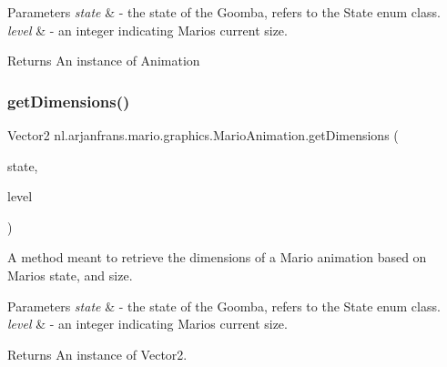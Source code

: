 \begin{DoxyParams}{Parameters}
{\em state} & -\/ the state of the Goomba, refers to the State enum class. \\
\hline
{\em level} & -\/ an integer indicating Mario\textquotesingle{}s current size. \\
\hline
\end{DoxyParams}
\begin{DoxyReturn}{Returns}
An instance of Animation 
\end{DoxyReturn}
\mbox{\label{classnl_1_1arjanfrans_1_1mario_1_1graphics_1_1MarioAnimation_aa4b74896a7eea77ece64354a3426b7c7}} 
\subsubsection{\texorpdfstring{get\+Dimensions()}{getDimensions()}}
{\footnotesize\ttfamily Vector2 nl.\+arjanfrans.\+mario.\+graphics.\+Mario\+Animation.\+get\+Dimensions (\begin{DoxyParamCaption}\item[{State}]{state,  }\item[{int}]{level }\end{DoxyParamCaption})}



A method meant to retrieve the dimensions of a Mario animation based on Mario\textquotesingle{}s state, and size. 


\begin{DoxyParams}{Parameters}
{\em state} & -\/ the state of the Goomba, refers to the State enum class. \\
\hline
{\em level} & -\/ an integer indicating Mario\textquotesingle{}s current size. \\
\hline
\end{DoxyParams}
\begin{DoxyReturn}{Returns}
An instance of Vector2. 
\end{DoxyReturn}
\mbox{\label{classnl_1_1arjanfrans_1_1mario_1_1graphics_1_1MarioAnimation_ab0abed641099c07a993255f63b2f59b9}} 
